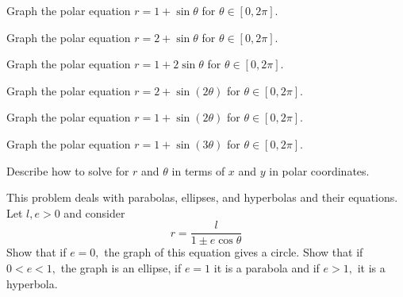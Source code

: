 \begin{enumialphparenastyle}
\begin{ex} Graph the polar equation $r=1+\sin \theta $ for $\theta \in \left[ 0,2\pi \right]$.
\end{ex}

\begin{ex} Graph the polar equation $r=2+\sin \theta $ for $\theta \in \left[ 0,2\pi \right]$.
\end{ex}

\begin{ex} Graph the polar equation $r=1+2\sin \theta $ for $\theta \in \left[ 0,2\pi \right]$.
\end{ex}

\begin{ex} Graph the polar equation $r=2+\sin \left( 2\theta \right) $ for $\theta \in \left[ 0,2\pi 
\right]$.
\end{ex}

\begin{ex} Graph the polar equation $r=1+\sin \left( 2\theta \right) $ for $\theta \in \left[ 0,2\pi 
\right]$.
\end{ex}

\begin{ex} Graph the polar equation $r=1+\sin \left( 3\theta \right) $ for $\theta \in \left[ 0,2\pi 
\right] $.
\end{ex}


\begin{ex} Describe how to solve for $r$ and $\theta $ in terms of $x$ and $y$ in polar
coordinates.
\end{ex}

\begin{ex} This problem deals with parabolas, ellipses, and
hyperbolas and their equations. Let $l,e>0$ and consider
\begin{equation*}
r=\frac{l}{1\pm e\cos \theta }
\end{equation*}
Show that if $e=0,$ the graph of this equation gives a circle. Show that if $0<e<1,$ the graph is an ellipse, if $e=1$
it is a parabola and if $e>1,$ it is a hyperbola.
\end{ex}

\end{enumialphparenastyle}